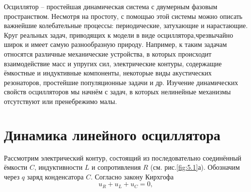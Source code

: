Осциллятор – простейшая динамическая система с двумерным фазовым
пространством. Несмотря на простоту, с помощью этой системы можно описать
важнейшие колебательные процессы: периодические, затухающие и
нарастающие. Круг реальных задач, приводящих к модели в виде
осциллятора,чрезвычайно широк и имеет самую разнообразную природу.
Например, к таким задачам относятся различные механические устройства, в
которых происходит взаимодействие масс и упругих сил, электрические
контуры, содержащие ёмкостные и индуктивные компоненты, некоторые виды
акустических резонаторов, простейшие популяционные задачи и др. Изучение
динамических свойств осцилляторов мы начнём с задач, в которых нелинейные
механизмы отсутствуют или пренебрежимо малы.

\section{Динамика линейного осциллятора}%
\label{sec:5.1}

Рассмотрим электрический контур, состоящий из последовательно соединённый ёмкости $C$, индуктивности $L$ и сопротивления $R$ (см. рис.\ref{fig:5.1}а).
Обозначим через $q$ заряд конденсатора $C$. Согласно закону Кирхгофа
\begin{equation}
        \label{eq:5.1}
        u_R + u_L + u_C =0,
\end{equation}


